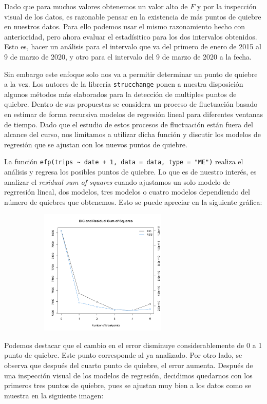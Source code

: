 \documentclass[
]{article}
\begin{document}
Dado que para muchos valores obtenemos un valor alto de \(F\) y por la
inspección visual de los datos, es razonable pensar en la existencia de
más puntos de quiebre en nuestros datos. Para ello podemos usar el mismo
razonamiento hecho con anterioridad, pero ahora evaluar el estadísitico
para los dos intervalos obtenidos. Esto es, hacer un análisis para el
intervalo que va del primero de enero de 2015 al 9 de marzo de 2020, y
otro para el intervalo del 9 de marzo de 2020 a la fecha.

Sin embargo este enfoque solo nos va a permitir determinar un punto de
quiebre a la vez. Los autores de la librería \texttt{strucchange} ponen
a nuestra disposición algunos métodos más elaborados para la detección
de multiples puntos de quiebre. Dentro de sus propuestas se considera un
proceso de fluctuación basado en estimar de forma recursiva modelos de
regresión lineal para diferentes ventanas de tiempo. Dado que el estudio
de estos procesos de fluctuación están fuera del alcance del curso, nos
limitamos a utilizar dicha función y discutir los modelos de regresión
que se ajustan con los nuevos puntos de quiebre.

La función
\texttt{efp(trips\ \textasciitilde{}\ date\ +\ 1,\ data\ =\ data,\ type\ =\ "ME")}
realiza el análisis y regresa los posibles puntos de quiebre. Lo que es
de nuestro interés, es analizar el \emph{residual sum of squares} cuando
ajustamos un solo modelo de regrresión lineal, dos modelos, tres modelos
o cuatro modelos dependiendo del número de quiebres que obtenemos. Esto
se puede apreciar en la siguiente gráfica:

\begin{figure}[h]
\centering
\includegraphics[width=8cm, height=6cm]{../plots/structChange_files/structChange_17_3.png}
\end{figure}

Podemos destacar que el cambio en el error disminuye considerablemente
de 0 a 1 punto de quiebre. Este punto corresponde al ya analizado. Por
otro lado, se observa que después del cuarto punto de quiebre, el error
aumenta. Después de una inspección visual de los modelos de regresión,
decidimos quedarnos con los primeros tres puntos de quiebre, pues se
ajustan muy bien a los datos como se muestra en la siguiente imagen:
\end{document}

